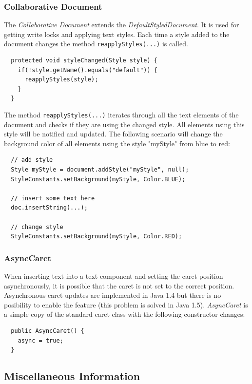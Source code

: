 \subsubsection{Collaborative Document}
\label{applicationlayer_collabdocument}

The \textit{Collaborative Document} extends the \textit{DefaultStyledDocument}. It is used for getting write locks and applying text styles. Each time a style added to the document changes the method \texttt{reapplyStyles(...)} is called.
\begin{verbatim}
  protected void styleChanged(Style style) {
    if(!style.getName().equals("default")) {
      reapplyStyles(style);
    }
  }
\end{verbatim}


The method \texttt{reapplyStyles(...)} iterates through all the text elements of the document and checks if they are using the changed style. All elements using
this style will be notified and updated. The following scenario will change the background color of all elements using the style "myStyle" from blue to red:
\begin{verbatim}
  // add style
  Style myStyle = document.addStyle("myStyle", null);
  StyleConstants.setBackground(myStyle, Color.BLUE);
  
  // insert some text here
  doc.insertString(...);
  
  // change style
  StyleConstants.setBackground(myStyle, Color.RED);
\end{verbatim}

\subsubsection{AsyncCaret}
When inserting text into a text component and setting the caret position asynchronously, it is possible that the caret is not set to the correct position. Asynchronous caret updates are implemented in Java 1.4 but there is no posibility to enable the feature (this problem is solved in Java 1.5). \textit{Async\-Caret} is a simple copy of the standard caret class with the following constructor changes:
\begin{verbatim}
  public AsyncCaret() {
    async = true;
  }
\end{verbatim}

\subsection{Miscellaneous Information}
